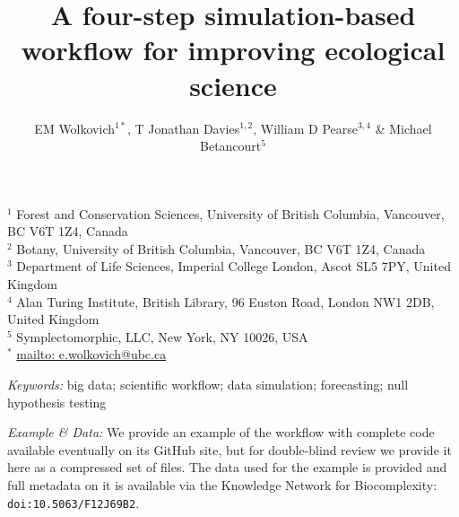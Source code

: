 \documentclass[11pt]{article}
\begin{document}

\renewcommand{\refname}{\CHead{}}


\title{A four-step simulation-based workflow for improving ecological science}
\author{EM Wolkovich$^{1*}$, T Jonathan Davies$^{1,2}$, William D Pearse$^{3,4}$ \& Michael Betancourt$^{5}$}
\maketitle

\noindent $^{1}$ Forest and Conservation Sciences, University of British Columbia, Vancouver, BC V6T 1Z4, Canada\\
$^{2}$ Botany, University of British Columbia, Vancouver, BC V6T 1Z4, Canada\\
$^{3}$ Department of Life Sciences, Imperial College London, Ascot SL5 7PY, United Kingdom \\
$^{4}$ Alan Turing Institute, British Library, 96 Euston Road, London NW1 2DB, United Kingdom \\
$^{5}$ Symplectomorphic, LLC, New York, NY 10026, USA \\
$^{*}$ \url{mailto: e.wolkovich@ubc.ca}
 
\vspace{3ex}
\noindent \emph{Keywords:} big data; scientific workflow; data simulation; forecasting; null hypothesis testing
\vspace{3ex}

\noindent\emph{Example \& Data:} We provide an example of the workflow with complete code available eventually on its GitHub site, but for double-blind review we provide it here as a compressed set of files.  The data used for the example is provided and full metadata on it is available via the Knowledge Network for Biocomplexity: \verb|doi:10.5063/F12J69B2|. %
\end{document}
